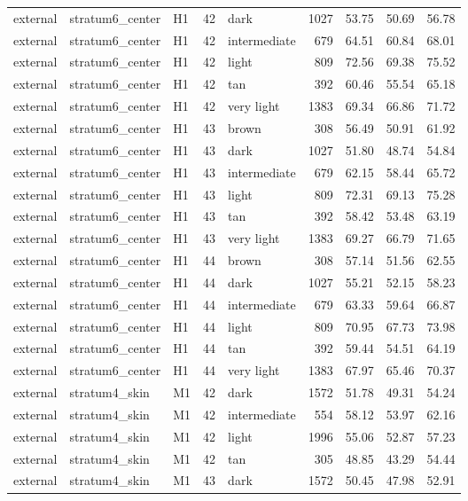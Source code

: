 \begin{tabular}{lllrlrrrr}
external & stratum6\_center & H1 & 42 & dark & 1027 & 53.75 & 50.69 & 56.78 \\
external & stratum6\_center & H1 & 42 & intermediate & 679 & 64.51 & 60.84 & 68.01 \\
external & stratum6\_center & H1 & 42 & light & 809 & 72.56 & 69.38 & 75.52 \\
external & stratum6\_center & H1 & 42 & tan & 392 & 60.46 & 55.54 & 65.18 \\
external & stratum6\_center & H1 & 42 & very light & 1383 & 69.34 & 66.86 & 71.72 \\
external & stratum6\_center & H1 & 43 & brown & 308 & 56.49 & 50.91 & 61.92 \\
external & stratum6\_center & H1 & 43 & dark & 1027 & 51.80 & 48.74 & 54.84 \\
external & stratum6\_center & H1 & 43 & intermediate & 679 & 62.15 & 58.44 & 65.72 \\
external & stratum6\_center & H1 & 43 & light & 809 & 72.31 & 69.13 & 75.28 \\
external & stratum6\_center & H1 & 43 & tan & 392 & 58.42 & 53.48 & 63.19 \\
external & stratum6\_center & H1 & 43 & very light & 1383 & 69.27 & 66.79 & 71.65 \\
external & stratum6\_center & H1 & 44 & brown & 308 & 57.14 & 51.56 & 62.55 \\
external & stratum6\_center & H1 & 44 & dark & 1027 & 55.21 & 52.15 & 58.23 \\
external & stratum6\_center & H1 & 44 & intermediate & 679 & 63.33 & 59.64 & 66.87 \\
external & stratum6\_center & H1 & 44 & light & 809 & 70.95 & 67.73 & 73.98 \\
external & stratum6\_center & H1 & 44 & tan & 392 & 59.44 & 54.51 & 64.19 \\
external & stratum6\_center & H1 & 44 & very light & 1383 & 67.97 & 65.46 & 70.37 \\
external & stratum4\_skin & M1 & 42 & dark & 1572 & 51.78 & 49.31 & 54.24 \\
external & stratum4\_skin & M1 & 42 & intermediate & 554 & 58.12 & 53.97 & 62.16 \\
external & stratum4\_skin & M1 & 42 & light & 1996 & 55.06 & 52.87 & 57.23 \\
external & stratum4\_skin & M1 & 42 & tan & 305 & 48.85 & 43.29 & 54.44 \\
external & stratum4\_skin & M1 & 43 & dark & 1572 & 50.45 & 47.98 & 52.91 \\

\end{tabular}
